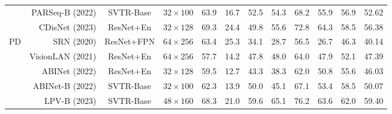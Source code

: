 \documentclass[10pt,journal,compsoc]{IEEEtran}
\begin{document}
\begin{table*}[t]
{\begin{tabular}{c|r|c|c|ccccccc|c}
                      & PARSeq-B \cite{BautistaA22PARSeq} (2022) & SVTR-Base   & $32\times100$   & 63.9                 & 16.7                                                      & 52.5                 & 54.3                 & 68.2                 & 55.9                                                   & 56.9                 & 52.62                                             \\
                      & CDisNet \cite{zheng2023cdistnet} (2023) & ResNet+En   & $32\times128$   & 69.3                 & 24.4                                                      & 49.8                 & 55.6                 & 72.8                 & 64.3                                                   & 58.5                 & 56.38                                             \\
                      \hline
\multirow{4}{*}{PD}   & SRN \cite{yu2020srn} (2020)   & ResNet+FPN   & $64\times256$      & 63.4                 & 25.3                                                      & 34.1                 & 28.7                 & 56.5                 & 26.7                                                   & 46.3                 & 40.14                                             \\
                      & VisionLAN \cite{Wang_2021_visionlan} (2021) & ResNet+En   & $64\times256$   & 57.7                 & 14.2                                                      & 47.8                 & 48.0                 & 64.0                 & 47.9                                                   & 52.1                 & 47.39                                             \\
                      & ABINet  \cite{TPAMI2022ABINetPP} (2022) & ResNet+En  & $32\times128$     & 59.5                 & 12.7                                                      & 43.3                 & 38.3                 & 62.0                 & 50.8                                                   & 55.6                 & 46.03                                             \\
                      & ABINet-B \cite{TPAMI2022ABINetPP} (2022) & SVTR-Base  & $32\times100$     & 62.3                 & 13.9                                                      & 50.0                 & 45.1                 & 67.1                 & 53.4                                                   & 58.5                 & 50.07                                             \\
                      & LPV-B \cite{ijcai2023LPV} (2023) & SVTR-Base  & $48\times160$     & 68.3                 & 21.0                                                      & 59.6                 & 65.1                 & 76.2                 & 63.6                                                   & 62.0                 & 59.40                                             \\

\end{tabular}}
\end{table*}
\end{document}
